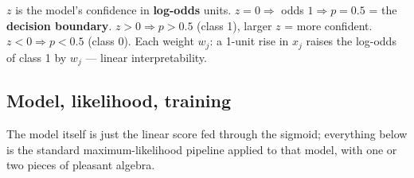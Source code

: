 \documentclass[11pt, a4paper]{article}
\newcommand{\kw}[1]{\textbf{#1}}
\begin{document}
\begin{notebox}[what the real-number score $z=w^\top x$ means]
$z$ is the model's confidence in \kw{log-odds} units. $z=0\Rightarrow$ odds $1\Rightarrow p=0.5$ =
the \kw{decision boundary}. $z>0\Rightarrow p>0.5$ (class 1), larger $z$ = more confident.
$z<0\Rightarrow p<0.5$ (class 0). Each weight $w_j$: a 1-unit rise in $x_j$ raises the log-odds of
class 1 by $w_j$ — linear interpretability.
\end{notebox}

\subsection{Model, likelihood, training}

The model itself is just the linear score fed through the sigmoid; everything below is the standard
maximum-likelihood pipeline applied to that model, with one or two pieces of pleasant algebra.
\end{document}
